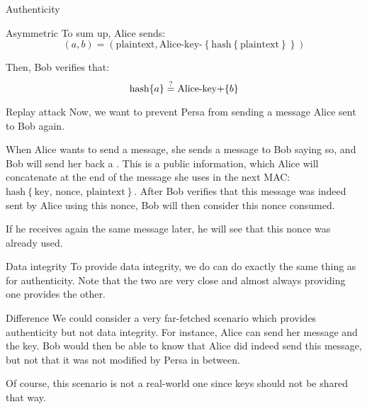 \documentclass[a4paper]{article}
\begin{document}
\begin{parag}{Authenticity}
\begin{subparag}{Asymmetric}
        To sum up, Alice sends: 
        \[\left(a, b\right) = \left(\text{plaintext}, \text{Alice-key-}\left\{\text{hash}\left\{\text{plaintext}\right\}\right\}\right)\]
        
        Then, Bob verifies that:
        \[\text{hash}\left\{a\right\} \over{=}{?}  \text{Alice-key+}\left\{b\right\}\]
    \end{subparag}
    
    \begin{subparag}{Replay attack}
        Now, we want to prevent Persa from sending a message Alice sent to Bob again.

        When Alice wants to send a message, she sends a message to Bob saying so, and Bob will send her back a . This is a public information, which Alice will concatenate at the end of the message she uses in the next MAC: $\text{hash}\left\{\text{key, nonce, plaintext}\right\}$. After Bob verifies that this message was indeed sent by Alice using this nonce, Bob will then consider this nonce consumed.

        If he receives again the same message later, he will see that this nonce was already used.
    \end{subparag}
\end{parag}

\begin{parag}{Data integrity}
    To provide data integrity, we do can do exactly the same thing as for authenticity. Note that the two are very close and almost always providing one provides the other.

    \begin{subparag}{Difference}
        We could consider a very far-fetched scenario which provides authenticity but not data integrity. For instance, Alice can send her message and the key. Bob would then be able to know that Alice did indeed send this message, but not that it was not modified by Persa in between.

        Of course, this scenario is not a real-world one since keys should not be shared that way.
    \end{subparag}
\end{parag}
\end{document}
